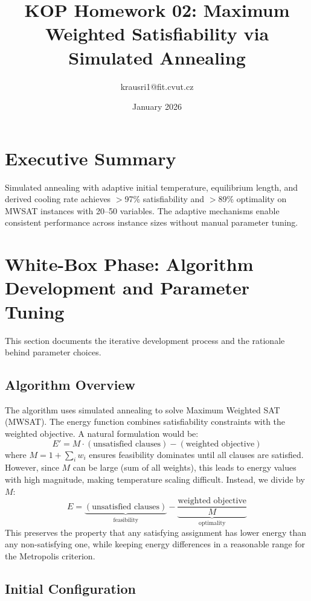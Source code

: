 \documentclass[11pt]{article}
\title{KOP Homework 02: Maximum Weighted Satisfiability via Simulated Annealing}
\author{krausri1@fit.cvut.cz}
\date{January 2026}
\begin{document}
    \maketitle


    \section*{Executive Summary}

    Simulated annealing with adaptive initial temperature, equilibrium length, and derived
    cooling rate achieves $>$97\% satisfiability and $>$89\% optimality on MWSAT instances
    with 20--50 variables.
    The adaptive mechanisms enable consistent performance across
    instance sizes without manual parameter tuning.


    \section{White-Box Phase: Algorithm Development and Parameter Tuning}

    This section documents the iterative development process and the rationale behind parameter choices.

    \subsection{Algorithm Overview}

    The algorithm uses simulated annealing to solve Maximum Weighted SAT (MWSAT).
    The energy function combines satisfiability constraints with the weighted objective.
    A natural formulation would be:
    \[
        E' = M \cdot (\text{unsatisfied clauses}) - (\text{weighted objective})
    \]
    where $M = 1 + \sum_i w_i$ ensures feasibility dominates until all clauses are satisfied.
    However, since $M$ can be large (sum of all weights), this leads to energy values
    with high magnitude, making temperature scaling difficult.
    Instead, we divide by $M$:
    \[
        E = \underbrace{(\text{unsatisfied clauses})}_{\text{feasibility}}
        - \underbrace{\frac{\text{weighted objective}}{M}}_{\text{optimality}}
    \]
    This preserves the property that any satisfying assignment has lower energy than any
    non-satisfying one, while keeping energy differences in a reasonable range for
    the Metropolis criterion.

    \subsection{Initial Configuration}
\end{document}
